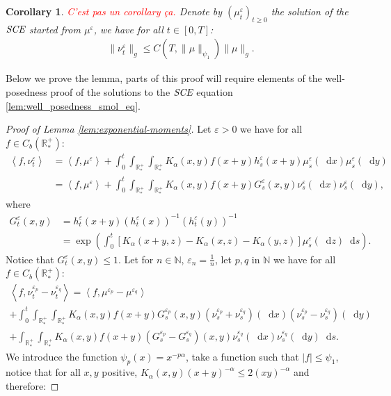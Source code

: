 \documentclass[11pt,a4paper]{article}
\newcommand{\NN}{\mathbb{N}}
\newcommand{\RRP}{\mathbb{R}^+_*}
\newcommand{\SCE}{\emph{SCE}}
\newcommand{\red}[1]{\textcolor{red}{#1}}
\newcommand{\Proc}[1]{\left(#1\right)_{t\geq 0}}
\newcommand{\brac}[1]{\left\langle#1\right\rangle}
\newcommand{\dd}{\mathop{}\!\mathrm{d}}
\newtheorem{corollary}[theorem]{Corollary}
\begin{document}
\begin{corollary}
    \red{C'est pas un corollary ça.}
    Denote by $\Proc{\mu^\varepsilon_t}$ the solution of the $\SCE$ started from $\mu^\varepsilon$, we have for all $t \in [0,T]$:
    \begin{align*}
        \| \nu^\varepsilon_t\|_g \leq C(T,\|\mu\|_{\psi_1})\|\mu\|_{g}.
    \end{align*}
\end{corollary}
Below we prove the lemma, parts of this proof will require elements of the well-posedness proof of the solutions to the $\SCE$ equation \ref{lem:well_posedness_smol_eq}.
\begin{proof}[Proof of Lemma \ref{lem:exponential-moments}]
    Let $\varepsilon > 0$ we have for all $f \in C_b(\RRP)$:
    \begin{align*}
        \brac{f,\nu_t^\varepsilon} &= \brac{f,\mu^\varepsilon} + \int_0^t \int_{\RRP}\int_{\RRP}K_\alpha(x,y)f(x+y)h_s^\varepsilon(x+y) \mu_s^\varepsilon(\dd x) \mu_s^\varepsilon(\dd y) \\
        &= \brac{f,\mu^\varepsilon} + \int_0^t \int_{\RRP}\int_{\RRP}K_\alpha(x,y)f(x+y)G_s^\varepsilon(x,y) \nu_s^\varepsilon(\dd x) \nu_s^\varepsilon(\dd y),
    \end{align*}
    where
    \begin{align*}
        G_t^\varepsilon(x,y) &= h_t^\varepsilon(x+y)\left(h_t^\varepsilon(x)\right)^{-1}\left(h_t^\varepsilon(y)\right)^{-1} \\
        &= \exp{\left(\int_0^t \left[K_\alpha(x+y,z) - K_\alpha(x,z) - K_\alpha(y,z)\right]\mu^\varepsilon_s(\dd z) \dd s \right)}.
    \end{align*}
    Notice that $G_t^\varepsilon(x,y) \leq 1$. Let for $n\in \NN$, $\varepsilon_n = \frac1n$, let $p,q$ in $\NN$ we have for all $f \in C_b(\RRP)$:
    \begin{multline*}
        \brac{f,\nu_t^{\varepsilon_p}-\nu_t^{\varepsilon_q}} = \brac{f,\mu^{\varepsilon_p} - \mu^{\varepsilon_q}} 
        \\+ \int_0^t \int_{\RRP}\int_{\RRP}K_\alpha(x,y)f(x+y) G^{\varepsilon_p}_s(x,y)(\nu_s^{\varepsilon_p} + \nu_s^{\varepsilon_q})(\dd x)(\nu_s^{\varepsilon_p} -\nu_s^{\varepsilon_q} )(\dd y) \\
        + \int_{\RRP}\int_{\RRP}K_\alpha(x,y)f(x+y) (G^{\varepsilon_p}_s - G^{\varepsilon_q}_s)(x,y)\nu_s^{\varepsilon_q}(\dd x)\nu_s^{\varepsilon_q}(\dd y) \dd s.
    \end{multline*}
    We introduce the function $\psi_p(x) = x^{-p\alpha}$, take a function such that $|f| \leq \psi_1$, notice that for all $x,y$ positive, $K_\alpha(x,y)(x+y)^{-\alpha} \leq 2(xy)^{-\alpha}$ and therefore:

\end{proof}
\end{document}

